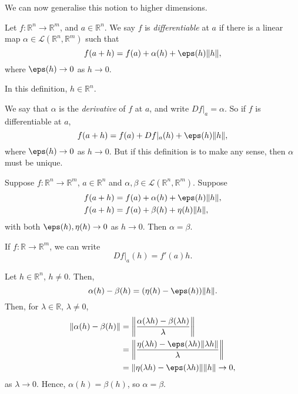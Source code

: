 \documentclass[12pt]{article}
\begin{document}
We can now generalise this notion to higher dimensions.

\begin{definition}
	Let $f : \mathbb{R}^{n} \to \mathbb{R}^{m}$, and $a \in \mathbb{R}^{n}$. We say $f$ is \textit{differentiable} at $a$ if there is a linear map $\alpha \in \mathcal{L}(\mathbb{R}^{n}, \mathbb{R}^{m})$ such that
	\[
		f(a+h) = f(a) + \alpha(h) + \eps(h) \|h\|
	,\]
	where $\eps(h) \to 0$ as $h \to 0$.
\end{definition}

\begin{remark}
	In this definition, $h \in \mathbb{R}^{n}$.
\end{remark}

We say that $\alpha$ is the \textit{derivative} of $f$ at $a$, and write $Df|_a = \alpha$. So if $f$ is differentiable at $a$,
\[
	f(a+h) = f(a) + Df|_a(h) + \eps(h)\|h\|
,\]
where $\eps(h) \to 0$ as $h \to 0$. But if this definition is to make any sense, then $\alpha$ must be unique.

\begin{proposition}
	Suppose $f : \mathbb{R}^{n} \to \mathbb{R}^{m}$, $a \in \mathbb{R}^{n}$ and $\alpha, \beta \in \mathcal{L}(\mathbb{R}^{n}, \mathbb{R}^{m})$. Suppose
	\begin{align*}
		f(a+h) &= f(a) + \alpha(h) + \eps(h) \|h\|,\\
		f(a+h) &= f(a) + \beta(h) + \eta(h)\|h\|,
	\end{align*}
	with both $\eps(h),\eta(h) \to 0$ as $h \to 0$. Then $\alpha = \beta$.
\end{proposition}

\begin{remark}
	If $f : \mathbb{R} \to \mathbb{R}^{m}$, we can write
	\[
		Df|_a (h) = f'(a)h
	.\]
\end{remark}

\begin{proofbox}
	Let $h \in \mathbb{R}^{n}$, $h \neq 0$. Then,
	\[
	\alpha(h) - \beta(h) = (\eta(h) - \eps(h)) \|h\|
	.\]
	Then, for $\lambda \in \mathbb{R}$, $\lambda \neq 0$,
	\begin{align*}
		\|\alpha(h) - \beta(h)\| &= \biggl\| \frac{\alpha(\lambda h) - \beta(\lambda h)}{\lambda} \biggr\| \\\
		&= \biggl\| \frac{\eta(\lambda h) - \eps(\lambda h) \|\lambda h\|}{\lambda}\biggr\| \\
		&= \| \eta(\lambda h) - \eps(\lambda h)\|\|h\| \to 0,
	\end{align*}
	as $\lambda \to 0$. Hence, $\alpha(h) = \beta(h)$, so $\alpha = \beta$.
\end{proofbox}
\end{document}
